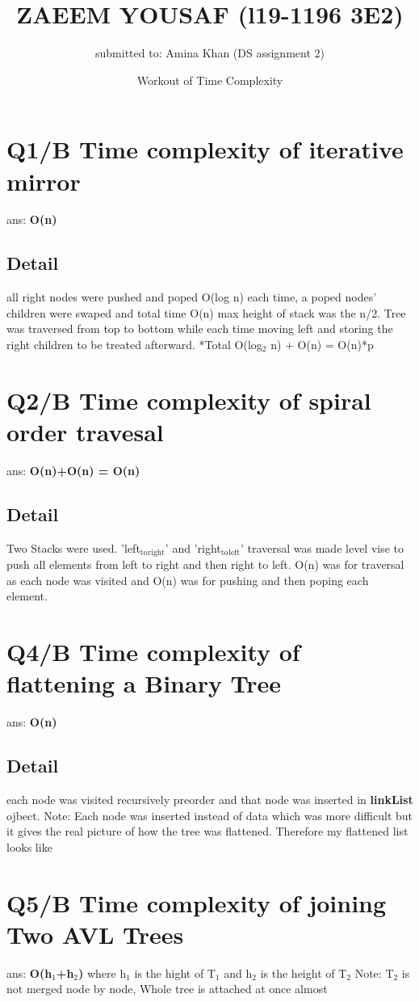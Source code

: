 \documentclass[11pt]{article}
\author{submitted to: Amina Khan (DS assignment 2)}
\date{Workout of Time Complexity}
\title{ZAEEM YOUSAF (l19-1196 3E2)}
\begin{document}
\maketitle
\tableofcontents

\section{Q1/B Time complexity of iterative mirror}
\label{sec:orgee8c8ae}
ans: \textbf{O(n)}
\subsection{Detail}
\label{sec:orgf5bb0a9}
all right nodes were pushed and poped O(log n)
each time, a poped nodes' children were swaped and total time O(n)
max height of stack was the n/2.
Tree was traversed from top to bottom while each time moving left and storing the right children to be treated afterward.
*Total O(log\(_{\text{2}}\) n) + O(n) = O(n)*p

\section{Q2/B Time complexity of spiral order travesal}
\label{sec:org30ab638}
ans: \textbf{O(n)+O(n) = O(n)}
\subsection{Detail}
\label{sec:org052ed6a}
   Two Stacks were used. 'left\(_{\text{to}}\)\(_{\text{right}}\)' and 'right\(_{\text{to}}\)\(_{\text{left}}\)' traversal was made level vise to push all elements from left to right and then right to left.
O(n) was for traversal as each node was visited and O(n) was for pushing and then poping each element.

\section{Q4/B Time complexity of flattening a Binary Tree}
\label{sec:org41ce498}
ans: \textbf{O(n)}
\subsection{Detail}
\label{sec:orgc2596e9}
each node was visited recursively preorder and that node was inserted in \textbf{linkList} ojbect. Note: Each node was inserted instead of data which was more difficult but it gives the real picture of how the tree was flattened.
Therefore my flattened list looks like
\section{Q5/B Time complexity of joining Two AVL Trees}
\label{sec:org582c1a5}
ans: \textbf{O(h\(_{\text{1}}\)+h\(_{\text{2}}\))} where h\(_{\text{1}}\) is the hight of T\(_{\text{1}}\) and h\(_{\text{2}}\) is the height of T\(_{\text{2}}\)
Note: T\(_{\text{2}}\) is not merged node by node, Whole tree is attached at once almost
\end{document}
